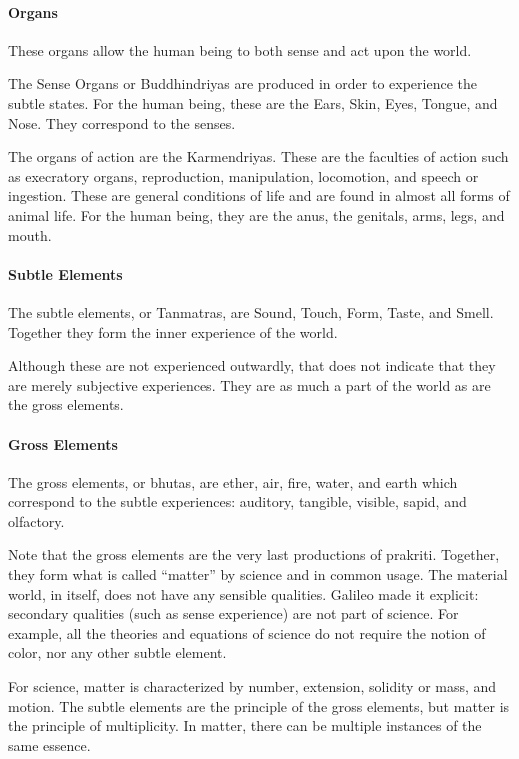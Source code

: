 \paragraph{Organs}
These organs allow the human being to both sense and act upon the world.

The Sense Organs or Buddhindriyas are produced in order to experience the subtle states. For the human being, these are the Ears, Skin, Eyes, Tongue, and Nose. They correspond to the senses.

The organs of action are the Karmendriyas. These are the faculties of action such as execratory organs, reproduction, manipulation, locomotion, and speech or ingestion. These are general conditions of life and are found in almost all forms of animal life. For the human being, they are the anus, the genitals, arms, legs, and mouth.

\paragraph{Subtle Elements}
The subtle elements, or Tanmatras, are Sound, Touch, Form, Taste, and Smell. Together they form the inner experience of the world.

Although these are not experienced outwardly, that does not indicate that they are merely subjective experiences. They are as much a part of the world as are the gross elements.

\paragraph{Gross Elements}
The gross elements, or bhutas, are ether, air, fire, water, and earth which correspond to the subtle experiences: auditory, tangible, visible, sapid, and olfactory.

Note that the gross elements are the very last productions of prakriti. Together, they form what is called “matter” by science and in common usage. The material world, in itself, does not have any sensible qualities. Galileo made it explicit: secondary qualities (such as sense experience) are not part of science. For example, all the theories and equations of science do not require the notion of color, nor any other subtle element.

For science, matter is characterized by number, extension, solidity or mass, and motion. The subtle elements are the principle of the gross elements, but matter is the principle of multiplicity. In matter, there can be multiple instances of the same essence.

